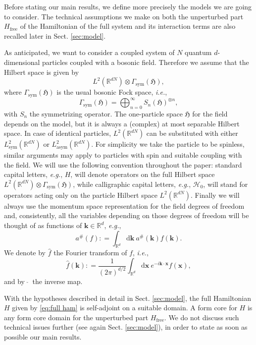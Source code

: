 \documentclass[11pt,a4paper,reqno]{amsart}
\theoremstyle{definition}
\newcommand{\hfree}{H_{\mathrm{free}}}
\numberwithin{equation}{section}
\newcommand{\beq}{\begin{equation}}
\newcommand{\eeq}{\end{equation}}
\newcommand{\lf}{\left}
\newcommand{\ri}{\right}
\newcommand{\xv}{\mathbf{x}}
\newcommand{\kv}{\mathbf{k}}
\newcommand{\diff}{\mathrm{d}}
\newcommand{\hamf}{H_{\mathrm{free}}}
\newcommand{\R}{\mathbb{R}}
\newcommand{\HH}{\mathcal{H}}
\begin{document}
Before stating our main results, we define more precisely the models we are going to consider. The technical assumptions we make on both the unperturbed part $ \hfree $ of the Hamiltonian of the full system and its interaction terms are also recalled later in Sect. \ref{sec:model}.
 
 As anticipated, we want to consider a coupled system of $N$ quantum $d$-dimensional particles coupled with a bosonic field. Therefore we assume that the Hilbert space is given by 
\beq
	\label{eq:hilbert}
	L^2 (\mathbb{R}^{dN} )\otimes \Gamma_{\mathrm{sym}}\lf(\mathfrak{H}\ri),
\eeq
where $ \Gamma_{\mathrm{sym}}\lf(\mathfrak{H}\ri) $ is the usual bosonic Fock space, \emph{i.e.},
$$
	\Gamma_{\mathrm{sym}}(\mathfrak{H}) = \bigoplus_{n = 0}^{\infty} S_n \lf( \mathfrak{H}\ri)^{\otimes n},
$$
with $ S_n $ the symmetrizing operator. The one-particle space $\mathfrak{H}$ for the field
depends on the model, but it is always a (complex) at most separable Hilbert space. In case of identical particles, $ L^2 (\mathbb{R}^{dN} ) $ can be substituted with either $L^2_{\mathrm{sym}} (\mathbb{R}^{dN} )$ or $L^2_{\mathrm{asym}} (\mathbb{R}^{dN} )$.  For simplicity we take the particle to be spinless, similar arguments may apply to particles with spin and suitable coupling with the field. We will use the following convention throughout the paper: standard capital letters, {\it e.g.}, $  H $, will denote operators on the full Hilbert space $ L^2 (\mathbb{R}^{dN} )\otimes \Gamma_{\mathrm{sym}}\lf(\mathfrak{H}\ri) $, while calligraphic capital letters, {\it e.g.}, $  \HH_0 $,  will stand for operators acting only on the particle Hilbert space $ L^2 (\mathbb{R}^{dN} ) $. Finally we will always use the momentum space representation for the field degrees of freedom and, consistently, all the variables depending on those degrees of freedom will be thought of as functions of $ \kv \in \R^d $, {\it e.g.},
\beq
	a^{\#}(f) : = \int_{\R^d} \diff \kv \: a^{\#}(\kv) f(\kv).
\eeq
We denote by $ \hat{f} $ the Fourier transform of $ f $, {\it i.e.},
\beq
	\hat{f}(\kv) : = \frac{1}{(2\pi)^{d/2}} \int_{\R^d} \diff \xv \: e^{-i \kv \cdot \xv} f(\xv),
\eeq
and by $ \:\check{}\: $ the inverse map.

With the hypotheses described in detail in Sect. \ref{sec:model}, the full Hamiltonian $ H $ given by \eqref{eq:full ham} is self-adjoint on a suitable domain. A form core for $ H $ is any form core domain for the unperturbed part $ \hamf $. We do not discuss  such technical issues further (see again Sect. \ref{sec:model}), in order to state as soon as possible our main results. 
	
\end{document}
